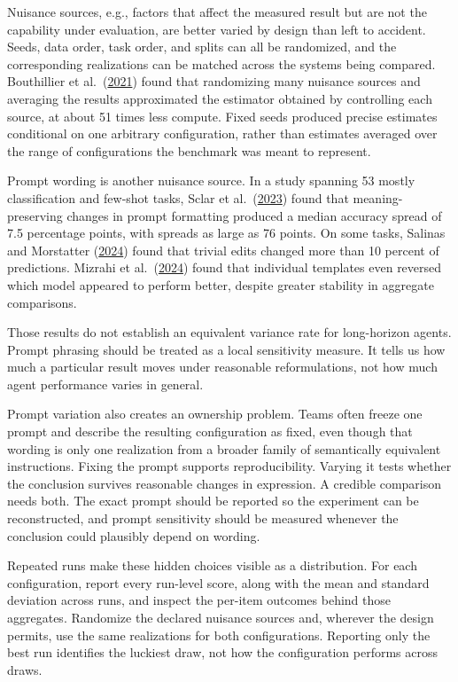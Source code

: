 Nuisance sources, e.g., factors that affect the measured result but are not the capability under evaluation, are better varied by design than left to accident. Seeds, data order, task order, and splits can all be randomized, and the corresponding realizations can be matched across the systems being compared. Bouthillier et al.~(\href{https://arxiv.org/abs/2103.03098}{2021}) found that randomizing many nuisance sources and averaging the results approximated the estimator obtained by controlling each source, at about 51 times less compute. Fixed seeds produced precise estimates conditional on one arbitrary configuration, rather than estimates averaged over the range of configurations the benchmark was meant to represent.

Prompt wording is another nuisance source. In a study spanning 53 mostly classification and few-shot tasks, Sclar et al.~(\href{https://arxiv.org/abs/2310.11324}{2023}) found that meaning-preserving changes in prompt formatting produced a median accuracy spread of 7.5 percentage points, with spreads as large as 76 points. On some tasks, Salinas and Morstatter (\href{https://arxiv.org/abs/2401.03729}{2024}) found that trivial edits changed more than 10 percent of predictions. Mizrahi et al.~(\href{https://arxiv.org/abs/2401.00595}{2024}) found that individual templates even reversed which model appeared to perform better, despite greater stability in aggregate comparisons.

Those results do not establish an equivalent variance rate for long-horizon agents. Prompt phrasing should be treated as a local sensitivity measure. It tells us how much a particular result moves under reasonable reformulations, not how much agent performance varies in general.

Prompt variation also creates an ownership problem. Teams often freeze one prompt and describe the resulting configuration as fixed, even though that wording is only one realization from a broader family of semantically equivalent instructions. Fixing the prompt supports reproducibility. Varying it tests whether the conclusion survives reasonable changes in expression. A credible comparison needs both. The exact prompt should be reported so the experiment can be reconstructed, and prompt sensitivity should be measured whenever the conclusion could plausibly depend on wording.

Repeated runs make these hidden choices visible as a distribution. For each configuration, report every run-level score, along with the mean and standard deviation across runs, and inspect the per-item outcomes behind those aggregates. Randomize the declared nuisance sources and, wherever the design permits, use the same realizations for both configurations. Reporting only the best run identifies the luckiest draw, not how the configuration performs across draws.

